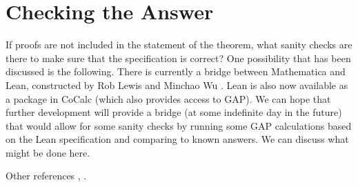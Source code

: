 \section{Checking the Answer}

If proofs are not included in the statement of the theorem, what
sanity checks are there to make sure that the specification is
correct?  One possibility that has been discussed is the following.
There is currently a bridge between Mathematica and Lean, constructed
by Rob Lewis and Minchao Wu \cite{L}.  Lean is also now available as a
package in CoCalc (which also provides access to GAP).  We can hope
that further development will provide a bridge (at some indefinite day
in the future) that would allow for some sanity checks by running some
GAP calculations based on the Lean specification and comparing to
known answers.  We can discuss what might be done here.


Other references \cite{aschbacher1994sporadic}, \cite{carter1985finite}.




